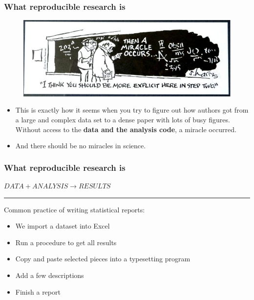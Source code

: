 \documentclass{beamer}
\begin{document}
\begin{frame}
\frametitle{What reproducible research is}
\begin{figure}
\includegraphics[scale=0.45]{figures/thenamiracleoccurs.jpg}
\end{figure}
\footnotesize
\begin{itemize}
	\item This is exactly how it seems when you try to figure out how authors got from a large and complex data set to a dense paper with lots of busy figures. \\Without access to the \textbf{data and the analysis code}, a miracle occurred.
\item And  there should be {\sc no miracles in science.} \citep{Markowetz:2016cs}
\end{itemize}
\end{frame}


\begin{frame}
\frametitle{What reproducible research is}
\Large\centering $DATA +  ANALYSIS \rightarrow RESULTS$\\
\rule{\textwidth}{0.05pt}\vspace{20px}
Common practice of writing statistical reports: 
\small\begin{itemize}
    \item We import a dataset into Excel
    \item Run a procedure to get all results
    \item Copy and paste selected pieces into a typesetting program
    \item Add a few descriptions
    \item Finish a report
\end{itemize}

\end{frame}
\end{document}
